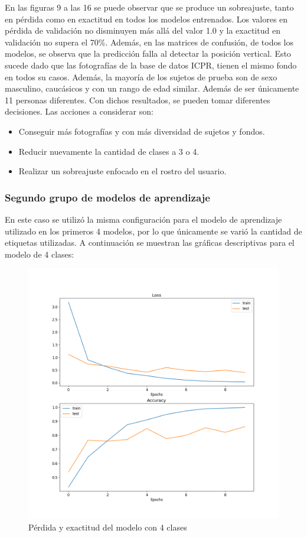 En las figuras 9 a las 16 se puede observar que se produce un sobreajuste, tanto en pérdida como en exactitud en todos los modelos entrenados. Los valores en pérdida de validación no disminuyen más allá del valor 1.0 y la exactitud en validación no supera el 70\%. Además, en las matrices de confusión, de todos los modelos, se observa que la predicción falla al detectar la posición vertical. Esto sucede dado que las fotografías de la base de datos ICPR, tienen el mismo fondo en todos su casos. Además, la mayoría de los sujetos de prueba son de sexo masculino, caucásicos y con un rango de edad similar. Además de ser únicamente 11 personas diferentes. Con dichos resultados, se pueden tomar diferentes decisiones. Las acciones a considerar son: 

\begin{itemize}
	\item Conseguir más fotografías y con más diversidad de sujetos y fondos.
	\item Reducir nuevamente la cantidad de clases a 3 o 4. 
	\item Realizar un sobreajuste enfocado en el rostro del usuario.
\end{itemize}

\subsubsection{Segundo grupo de modelos de aprendizaje}
En este caso se utilizó la misma configuración para el modelo de aprendizaje utilizado en los primeros 4 modelos, por lo que únicamente se varió la cantidad de etiquetas utilizadas. A continuación se muestran las gráficas descriptivas para el modelo de 4 clases:

\begin{figure}[H]
	\centering
	\includegraphics[scale=0.65]{figures/LA4.png}
	\caption{Pérdida y exactitud del modelo con 4 clases}
	\label{fig:img17}
\end{figure}

